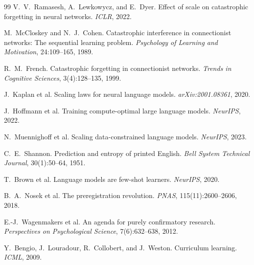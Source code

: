 \documentclass[11pt,a4paper]{article}
\begin{document}
\begin{thebibliography}{99}
V.~V.~Ramasesh, A.~Lewkowycz, and E.~Dyer.
\newblock Effect of scale on catastrophic forgetting in neural networks.
\newblock \emph{ICLR}, 2022.

M.~McCloskey and N.~J.~Cohen.
\newblock Catastrophic interference in connectionist networks: The sequential learning problem.
\newblock \emph{Psychology of Learning and Motivation}, 24:109--165, 1989.

R.~M.~French.
\newblock Catastrophic forgetting in connectionist networks.
\newblock \emph{Trends in Cognitive Sciences}, 3(4):128--135, 1999.

J.~Kaplan et al.
\newblock Scaling laws for neural language models.
\newblock \emph{arXiv:2001.08361}, 2020.

J.~Hoffmann et al.
\newblock Training compute-optimal large language models.
\newblock \emph{NeurIPS}, 2022.

N.~Muennighoff et al.
\newblock Scaling data-constrained language models.
\newblock \emph{NeurIPS}, 2023.

C.~E.~Shannon.
\newblock Prediction and entropy of printed English.
\newblock \emph{Bell System Technical Journal}, 30(1):50--64, 1951.

T.~Brown et al.
\newblock Language models are few-shot learners.
\newblock \emph{NeurIPS}, 2020.

B.~A.~Nosek et al.
\newblock The preregistration revolution.
\newblock \emph{PNAS}, 115(11):2600--2606, 2018.

E.-J.~Wagenmakers et al.
\newblock An agenda for purely confirmatory research.
\newblock \emph{Perspectives on Psychological Science}, 7(6):632--638, 2012.

Y.~Bengio, J.~Louradour, R.~Collobert, and J.~Weston.
\newblock Curriculum learning.
\newblock \emph{ICML}, 2009.

\end{thebibliography}
\end{document}
